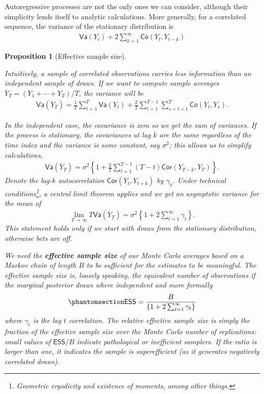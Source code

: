 \documentclass[
  11pt,
  letterpaper,
]{scrbook}
\theoremstyle{definition}
\theoremstyle{definition}
\theoremstyle{definition}
\theoremstyle{plain}
\newtheorem{proposition}{Proposition}[chapter]
\theoremstyle{plain}
\theoremstyle{remark}
\begin{document}
Autoregressive processes are not the only ones we can consider, although
their simplicity lends itself to analytic calculations. More generally,
for a correlated sequence, the variance of the stationary distribution
is \begin{align*}
\mathsf{Va}(Y_t) + 2 \sum_{k=1}^\infty \mathsf{Co}(Y_t, Y_{t-k})
\end{align*}

\begin{proposition}[Effective sample
size]\protect\hypertarget{prp-variance-clt}{}\label{prp-variance-clt}

Intuitively, a sample of correlated observations carries less
information than an independent sample of draws. If we want to compute
sample averages \(\overline{Y}_T=(Y_1+ \cdots + Y_T)/T\), the variance
will be \begin{align*}
\mathsf{Va}\left(\overline{Y}_T\right) = \frac{1}{T}\sum_{t=1}^T \mathsf{Va}(Y_t) + \frac{2}{T} \sum_{t=1}^{T-1}\sum_{s = t+1}^T \mathsf{Co}(Y_t, Y_s).
\end{align*}

In the independent case, the covariance is zero so we get the sum of
variances. If the process is stationary, the covariances at lag \(k\)
are the same regardless of the time index and the variance is some
constant, say \(\sigma^2\); this allows us to simplify calculations,
\begin{align*}
\mathsf{Va}(\overline{Y}_T) = \sigma^2 \left\{ 1 + \frac{2}{T}\sum_{t=1}^{T-1} (T-t) \mathsf{Cor}(Y_{T-k}, Y_{T})\right\}.
\end{align*} Denote the lag-\(k\) autocorrelation
\(\mathsf{Cor}(Y_{t}, Y_{t+k})\) by \(\gamma_k\). Under technical
conditions\footnote{Geometric ergodicity and existence of moments, among
  other things.}, a central limit theorem applies and we get an
asymptotic variance for the mean of \begin{align*}
\lim_{T \to \infty} T\mathsf{Va}\left(\overline{Y}_T\right) = \sigma^2 \left\{1+2\sum_{t=1}^\infty \gamma_t\right\}.
\end{align*} This statement holds only if we start with draws from the
stationary distribution, otherwise bets are off.

We need the \textbf{effective sample size} of our Monte Carlo averages
based on a Markov chain of length \(B\) to be sufficient for the
estimates to be meaningful. The effective sample size is, loosely
speaking, the equivalent number of observations if the marginal
posterior draws where independent and more formally
\begin{equation}\phantomsection\label{eq-effective-sample-size}{
\mathsf{ESS} = \frac{B}{\left\{1+2\sum_{t=1}^\infty \gamma_t\right\}}
}\end{equation} where \(\gamma_t\) is the lag \(t\) correlation. The
relative effective sample size is simply the fraction of the effective
sample size over the Monte Carlo number of replications: small values of
\(\mathsf{ESS}/B\) indicate pathological or inefficient samplers. If the
ratio is larger than one, it indicates the sample is superefficient (as
it generates negatively correlated draws).


\end{proposition}
\end{document}
